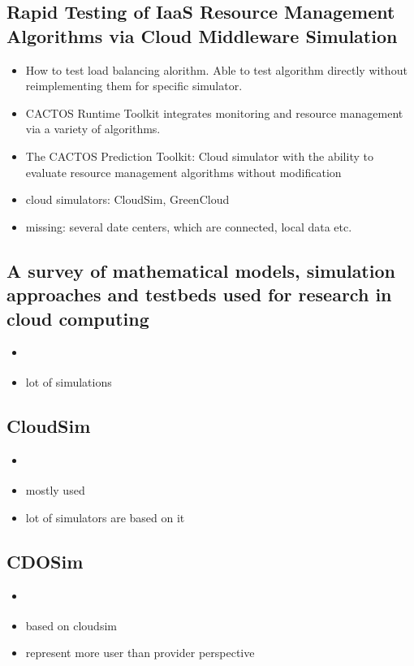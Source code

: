 \subsection{Rapid Testing of IaaS Resource Management Algorithms via Cloud Middleware Simulation}
\begin{itemize}
	\item How to test load balancing alorithm. Able to test algorithm directly without reimplementing them for specific simulator.
	\item CACTOS Runtime Toolkit integrates monitoring and resource management via a variety of algorithms.
	\item The CACTOS Prediction Toolkit: Cloud simulator with the ability to evaluate
	resource management algorithms without modification
	\item cloud simulators: CloudSim, GreenCloud
	\item missing: several date centers, which are connected, local data etc.
\end{itemize}

\subsection{A survey of mathematical models, simulation approaches and testbeds used for research in cloud computing}
\label{sec:StateOfTheArt:SurveyClouds}
\begin{itemize}
	\item \cite{survey_clouds}
	\item lot of simulations
\end{itemize}

\subsection{CloudSim}
\begin{itemize}
	\item \cite{cloud_sim}
	\item mostly used 
	\item lot of simulators are based on it
\end{itemize}

\subsection{CDOSim}
\begin{itemize}
	\item \cite{cdosim}
	\item based on cloudsim
	\item represent more user than provider perspective
\end{itemize}

